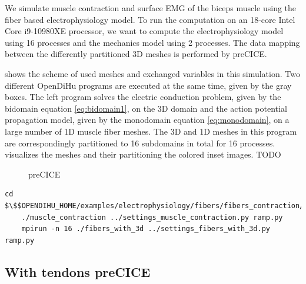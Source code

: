 We simulate muscle contraction and surface EMG of the biceps muscle using the fiber based electrophysiology model. To run the computation on an 18-core Intel Core i9-10980XE processor, we want to compute the electrophysiology model using 16 processes and the mechanics model using 2 processes. The data mapping between the differently partitioned 3D meshes is performed by preCICE.

 shows the scheme of used meshes and exchanged variables in this simulation. Two different OpenDiHu programs are executed at the same time, given by the gray boxes. The left program solves the electric conduction problem, given by the bidomain equation \cref{eq:bidomain1}, on the 3D domain and the action potential propagation model, given by the monodomain equation \cref{eq:monodomain}, on a large number of 1D muscle fiber meshes. The 3D and 1D meshes in this program are correspondingly partitioned to 16 subdomains in total for 16 processes.
 visualizes the meshes and their partitioning the colored inset images. TODO

\begin{figure}
  \centering%
  \def\svgwidth{0.9\textwidth}
  \caption{preCICE}%
  \label{fig:precice_muscle_force}%
\end{figure}



\begin{reproduce_no_break}
  \begin{lstlisting}[columns=fullflexible,breaklines=true,postbreak=\mbox{\textcolor{gray}{$\hookrightarrow$}\space}]
    cd $\$$OPENDIHU_HOME/examples/electrophysiology/fibers/fibers_contraction/with_precice_volume_coupling/build_release
    ./muscle_contraction ../settings_muscle_contraction.py ramp.py
    mpirun -n 16 ./fibers_with_3d ../settings_fibers_with_3d.py ramp.py
  \end{lstlisting}
\end{reproduce_no_break}

\subsection{With tendons preCICE}



